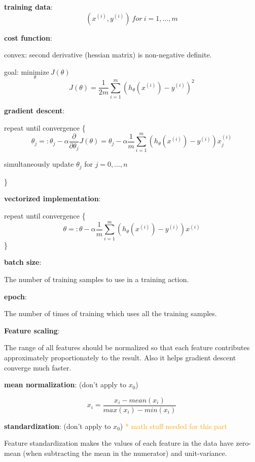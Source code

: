 \documentclass{article}
\begin{document}
\noindent \textbf{training data}:
\[(x^{(i)}, y^{(i)})\:for\:i = 1, \dots, m\]

\noindent \textbf{cost function}:

\noindent convex: second derivative (hessian matrix) is non-negative definite.

\noindent goal: \(\underset{\theta}{\text{minimize}} \: J(\theta)\)
\[J(\theta) = \frac{1}{2m} \sum_{i = 1}^m (h_{\theta}(x^{(i)}) - y^{(i)})^2\]

\noindent \textbf{gradient descent}:

\noindent repeat until convergence \{
\[\theta_j =: \theta_j - \alpha \frac{\partial}{\partial \theta_j} J(\theta) = \theta_j - \alpha \frac{1}{m} \sum_{i = 1}^m (h_{\theta}(x^{(i)}) - y^{(i)}) x^{(i)}_j\]
\centerline{simultaneously update \(\theta_j\) for \(j = 0, \dots, n\)}
\}

\bigskip

\noindent \textbf{vectorized implementation}:

\noindent repeat until convergence \{
\[\theta =: \theta - \alpha \frac{1}{m} \sum_{i = 1}^m (h_{\theta}(x^{(i)}) - y^{(i)}) x^{(i)}\]
\}

\bigskip

\noindent \textbf{batch size}:

\noindent The number of training samples to use in a training action.

\bigskip

\noindent \textbf{epoch}:

\noindent The number of times of training which uses all the training samples.

\bigskip

\noindent \textbf{Feature scaling}:

\noindent The range of all features should be normalized so that each feature contributes approximately proportionately to the result. Also it helps gradient descent converge much faster.

\bigskip

\noindent \textbf{mean normalization}: (don't apply to \(x_0\))

\[x_i = \frac{x_i - mean(x_i)}{max(x_i) - min(x_i)}\]

\bigskip

\noindent \textbf{standardization}: (don't apply to \(x_0\)) \textcolor{orange}{ * math stuff needed for this part}

\noindent Feature standardization makes the values of each feature in the data have zero-mean (when subtracting the mean in the numerator) and unit-variance.
\end{document}
